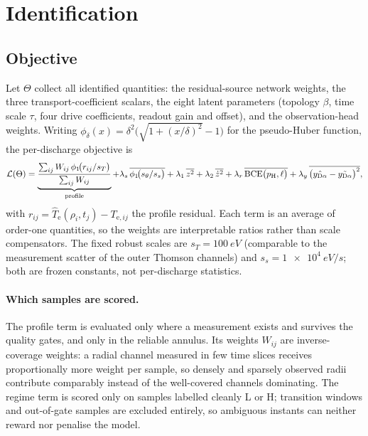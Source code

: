 
\section{Identification}
\label{sec:ident}

\subsection{Objective}
\label{sec:ident-loss}

Let $\Theta$ collect all identified quantities: the residual-source network
weights, the three transport-coefficient scalars, the eight latent
parameters (topology $\beta$, time scale $\tau$, four drive coefficients,
readout gain and offset), and the observation-head weights. Writing
$\phi_\delta(x) = \delta^2\big(\sqrt{1 + (x/\delta)^2} - 1\big)$ for the
pseudo-Huber function, the per-discharge objective is
\begin{equation}
\mathcal{L}(\Theta) =
\underbrace{\frac{\sum_{ij} W_{ij}\,\phi_1\!\big(r_{ij}/s_T\big)}{\sum_{ij} W_{ij}}}_{\text{profile}}
+ \lambda_s\,\overline{\phi_1\!\big(s_\theta/s_s\big)}
+ \lambda_1\,\overline{z^{2}}
+ \lambda_2\,\overline{\dot{z}^{2}}
+ \lambda_r\,\overline{\mathrm{BCE}\big(p_{\mathrm{H}},\ell\big)}
+ \lambda_y\,\overline{\big(\hat{y_{\mathrm{D}\alpha}} - \tilde{y_{\mathrm{D}\alpha}}\big)^{2}},
\label{eq:loss-full}
\end{equation}
with $r_{ij} = \hat T_{\mathrm{e}}(\rho_i,t_j) - T_{\mathrm{e},ij}$ the
profile residual. Each term is an average of order-one quantities, so the
weights are interpretable ratios rather than scale compensators. The fixed
robust scales are $s_T = \SI{100}{eV}$ (comparable to the measurement
scatter of the outer Thomson channels) and $s_s = \SI{1e4}{eV/s}$; both are
frozen constants, not per-discharge statistics.

\paragraph{Which samples are scored.} The profile term is evaluated only
where a measurement exists and survives the quality gates, and only in the
reliable annulus. Its weights $W_{ij}$ are inverse-coverage weights: a
radial channel measured in few time slices receives proportionally more
weight per sample, so densely and sparsely observed radii contribute
comparably instead of the well-covered channels dominating. The regime term
is scored only on samples labelled cleanly L or H; transition windows and
out-of-gate samples are excluded entirely, so ambiguous instants can neither
reward nor penalise the model.

